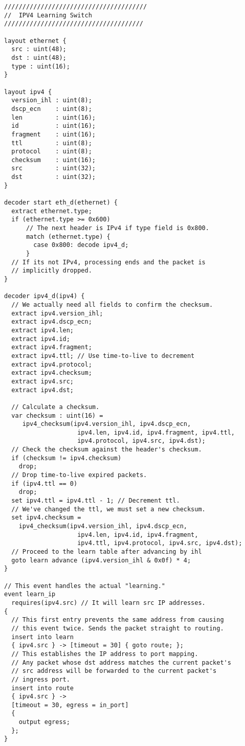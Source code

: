 \begin{lstlisting}
///////////////////////////////////////
//  IPV4 Learning Switch
//////////////////////////////////////

layout ethernet {
  src : uint(48);
  dst : uint(48);
  type : uint(16);
}

layout ipv4 {
  version_ihl : uint(8);
  dscp_ecn    : uint(8);
  len         : uint(16);
  id          : uint(16);
  fragment    : uint(16);
  ttl         : uint(8);
  protocol    : uint(8);
  checksum    : uint(16);
  src         : uint(32);
  dst         : uint(32);
}

decoder start eth_d(ethernet) {
  extract ethernet.type;
  if (ethernet.type >= 0x600)
      // The next header is IPv4 if type field is 0x800.
      match (ethernet.type) {
        case 0x800: decode ipv4_d;
      }
  // If its not IPv4, processing ends and the packet is
  // implicitly dropped.
}

decoder ipv4_d(ipv4) {
  // We actually need all fields to confirm the checksum.
  extract ipv4.version_ihl;
  extract ipv4.dscp_ecn;
  extract ipv4.len;
  extract ipv4.id;
  extract ipv4.fragment;
  extract ipv4.ttl; // Use time-to-live to decrement
  extract ipv4.protocol;
  extract ipv4.checksum;
  extract ipv4.src;
  extract ipv4.dst;

  // Calculate a checksum.
  var checksum : uint(16) =
     ipv4_checksum(ipv4.version_ihl, ipv4.dscp_ecn, 
     				ipv4.len, ipv4.id, ipv4.fragment, ipv4.ttl, 
     				ipv4.protocol, ipv4.src, ipv4.dst);
  // Check the checksum against the header's checksum.
  if (checksum != ipv4.checksum)
    drop;
  // Drop time-to-live expired packets.
  if (ipv4.ttl == 0)
    drop;
  set ipv4.ttl = ipv4.ttl - 1; // Decrement ttl.
  // We've changed the ttl, we must set a new checksum.
  set ipv4.checksum =
    ipv4_checksum(ipv4.version_ihl, ipv4.dscp_ecn, 
    				ipv4.len, ipv4.id, ipv4.fragment, 
    				ipv4.ttl, ipv4.protocol, ipv4.src, ipv4.dst);
  // Proceed to the learn table after advancing by ihl
  goto learn advance (ipv4.version_ihl & 0x0f) * 4;
}

// This event handles the actual "learning."
event learn_ip
  requires(ipv4.src) // It will learn src IP addresses.
{
  // This first entry prevents the same address from causing
  // this event twice. Sends the packet straight to routing.
  insert into learn
  { ipv4.src } -> [timeout = 30] { goto route; };
  // This establishes the IP address to port mapping.
  // Any packet whose dst address matches the current packet's
  // src address will be forwarded to the current packet's
  // ingress port.
  insert into route
  { ipv4.src } ->
  [timeout = 30, egress = in_port]
  {
    output egress;
  };
}


\end{lstlisting}
